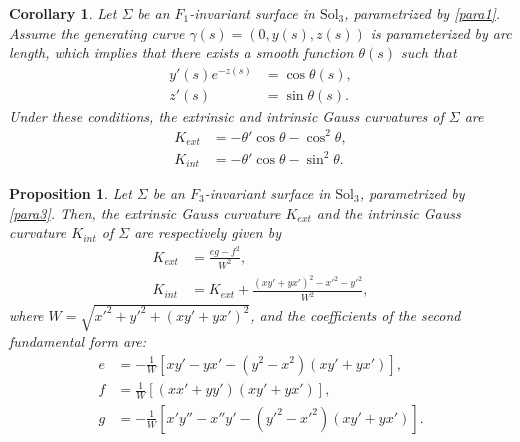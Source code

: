\documentclass[a4paper,12pt]{amsart}
\theoremstyle{plain}
\newtheorem{corollary}[theorem]{Corollary}
\newtheorem{proposition}[theorem]{Proposition}
\theoremstyle{definition}
\def\sol{\text{Sol}_3}
\begin{document}
\begin{corollary} \label{cor23}
Let $\Sigma$ be an $F_1$-invariant surface in $\sol$, parametrized by \eqref{para1}. Assume the generating curve $\gamma(s) = (0, y(s), z(s))$ is parameterized by arc length, which implies that there exists a smooth function $\theta(s)$ such that
\begin{equation}\label{1pp}
\begin{split}
y'(s) e^{-z(s)} &= \cos\theta(s), \\
z'(s) &= \sin\theta(s). 
\end{split}
\end{equation}
Under these conditions, the extrinsic and intrinsic Gauss curvatures of $\Sigma$ are
\begin{align*}
K_{ext} &= -\theta' \cos\theta -\cos^2\theta, \\
K_{int} &= -\theta'\cos\theta - \sin^2\theta.
\end{align*}
\end{corollary}
 

\begin{proposition} \label{pr26}
Let $\Sigma$ be an $F_3$-invariant surface in $\sol$, parametrized by \eqref{para3}. Then, the extrinsic Gauss curvature $K_{ext}$ and the intrinsic Gauss curvature $K_{int}$ of $\Sigma$ are respectively given by
\begin{align*}
K_{ext} &= \frac{eg - f^2}{W^2}, \\
K_{int} &= K_{ext} + \frac{(xy' + yx')^2 - x'^2 - y'^2}{W^2},
\end{align*}
where $W =\sqrt{ x'^2 + y'^2 + (xy' + yx')^2}$, and the coefficients of the second fundamental form are:
\begin{align*}
e &= -\frac{1}{W} \left[ xy' - yx' - (y^2 - x^2)(xy' + yx') \right], \\
f &= \frac{1}{W} \left[ (xx' + yy')(xy' + yx') \right], \\
g &= -\frac{1}{W} \left[ x'y'' - x''y' - (y'^2 - x'^2)(xy' + yx') \right].
\end{align*}
\end{proposition}
\end{document}
